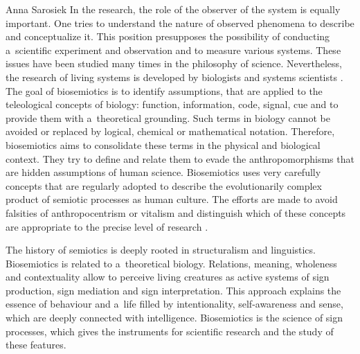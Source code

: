 \begin{artengenv}{Anna Sarosiek}
In the research, the role of the observer of the system is equally important. One tries to understand the nature of observed phenomena to describe and conceptualize it. This position presupposes the possibility of conducting a~scientific experiment and observation and to measure various systems. These issues have been studied many times in the philosophy of science. Nevertheless, the research of living systems is developed by biologists and systems scientists
\parencites[][]{kampis_self-modifying_1991}[][pp.63–78]{pattee_simulations_1989}[][]{rosen_fundamentals_1978}[][]{uexkull_semiotics_1984}. %
 The goal of biosemiotics is to identify assumptions, that are applied to the teleological concepts of biology: function, information, code, signal, cue and to provide them with a~theoretical grounding. Such terms in biology cannot be avoided or replaced by logical, chemical or mathematical notation. Therefore, biosemiotics aims to consolidate these terms in the physical and biological context. They try to define and relate them to evade the anthropomorphisms that are hidden assumptions of human science. Biosemiotics uses very carefully concepts that are regularly adopted to describe the evolutionarily complex product of semiotic processes as human culture. The efforts are made to avoid falsities of anthropocentrism or vitalism and distinguish which of these concepts are appropriate to the precise level of research 
\parencite[][]{tonnessen_biosemiosis_2013}.%


The history of semiotics is deeply rooted in structuralism and linguistics. Biosemiotics is related to a~theoretical biology. Relations, meaning, wholeness and contextuality allow to perceive living creatures as active systems of sign production, sign mediation and sign interpretation. This approach explains the essence of behaviour and a~life filled by intentionality, self-awareness and sense, which are deeply connected with intelligence. Biosemiotics is the science of sign processes, which gives the instruments for scientific research and the study of these features.


\end{artengenv}
